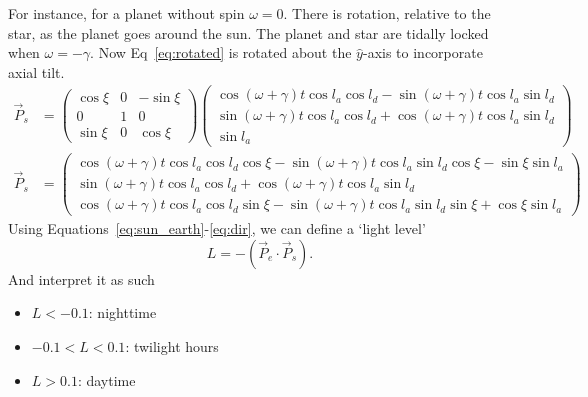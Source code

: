 \documentclass[12pt,a4paper]{article}
\begin{document}
For instance, for a planet without spin \(\omega = 0\). There is rotation, relative to the star, as the planet goes around the sun. The planet and star are tidally locked when \(\omega=-\gamma\). Now Eq~\eqref{eq:rotated} is rotated about the \(\hat{y}\)-axis to incorporate axial tilt. 
\begin{align}
\vec{P}_{s} &= \left(\begin{array}{ccc}\cos\xi  & 0 & -\sin\xi \\ 0 & 1 & 0 \\ \sin\xi & 0 & \cos\xi \end{array}\right)\left(\begin{array}{c} \cos(\omega+\gamma)t\cos l_{a}\cos l_{d} - \sin(\omega+\gamma)t\cos l_{a}\sin l_{d} \\ \sin(\omega + \gamma)t\cos l_{a}\cos l_{d} + \cos(\omega+\gamma)t\cos l_{a}\sin l_{d} \\ \sin l_{a} \end{array}\right) \\
\vec{P}_{s} &= \left(\begin{array}{c} \cos(\omega+\gamma)t\cos l_{a}\cos l_{d}\cos\xi - \sin(\omega+\gamma)t\cos l_{a}\sin l_{d}\cos\xi -\sin\xi\sin l_{a} \\ \sin(\omega + \gamma)t\cos l_{a}\cos l_{d} + \cos(\omega+\gamma)t\cos l_{a}\sin l_{d} \\ \cos(\omega+\gamma)t\cos l_{a}\cos l_{d}\sin\xi - \sin(\omega+\gamma)t\cos l_{a}\sin l_{d}\sin\xi + \cos\xi\sin l_{a} \end{array}\right) \label{eq:dir}
\end{align}
Using Equations~\eqref{eq:sun_earth}-\eqref{eq:dir}, we can define a `light level'
\begin{equation}
L = -(\vec{P}_{e}\cdot \vec{P}_{s}).
\end{equation}
And interpret it as such
\begin{itemize}
	\item \(L < -0.1\): nighttime
	\item \(-0.1 < L < 0.1\): twilight hours
	\item \(L>0.1\): daytime 
\end{itemize}
\end{document}
